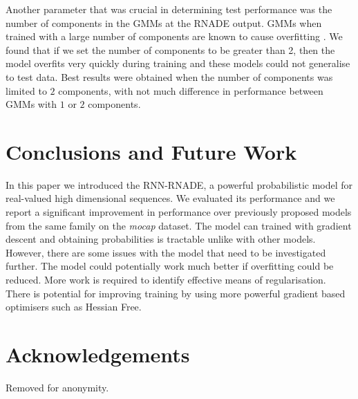 \documentclass{article} %
\begin{document}
Another parameter that was crucial in determining test performance was the number of components in the GMMs at the RNADE output. GMMs when trained with a large number of components are known to cause overfitting \cite{bishop2006pattern}. We found that if we set the number of components to be greater than 2, then the model overfits very quickly during training and these models could not generalise to test data. Best results were obtained when the number of components was limited to $2$ components, with not much difference in performance between GMMs with $1$ or $2$ components.  

\section{Conclusions and Future Work}

In this paper we introduced the RNN-RNADE, a powerful probabilistic model for real-valued high dimensional sequences. We evaluated its performance and we report a significant improvement in performance over previously proposed models from the same family on the \textit{mocap} dataset. The model can trained with gradient descent and obtaining probabilities is tractable unlike with other models. However, there are some issues with the model that need to be investigated further. The model could potentially work much better if overfitting could be reduced. More work is required to identify effective means of regularisation. There is potential for improving training by using more powerful gradient based optimisers such as Hessian Free. 
\label{conclusion}

\section{Acknowledgements}

Removed for anonymity. 



\end{document}
